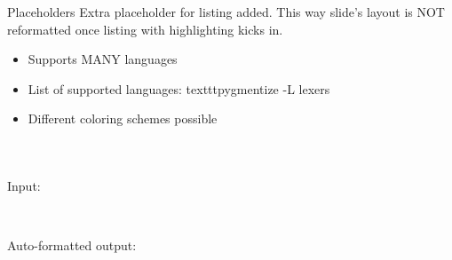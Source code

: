 {
\begin{block}{Placeholders}
Extra placeholder for listing added.
This way slide's layout is NOT reformatted once listing with highlighting kicks in.
\end{block}

}


{
\begin{itemize}
\item Supports MANY languages
\item List of supported languages: texttt{pygmentize -L lexers}
\item Different coloring schemes possible
\end{itemize}
}


{
\inputminted[linenos]{ini}{misc/inventory.ini}
}


{
\inputminted[linenos]{bash}{misc/script.sh}
}


{
\inputminted[linenos]{json}{json/mice.format.json}
}


{
Input: \\\
\inputminted[linenos]{json}{json/json_to_reformat.json}

Auto-formatted output: \\
\inputminted[linenos]{json}{json/json_to_reformat.format.json}
}
